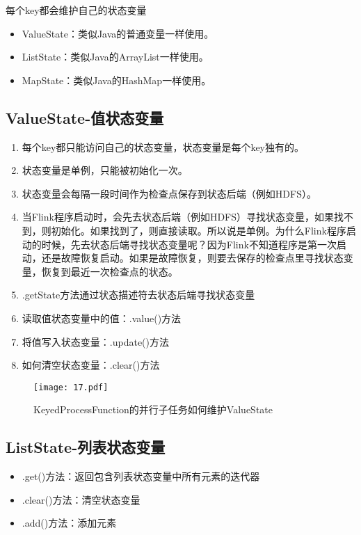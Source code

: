 \documentclass[cn,11pt,chinese]{elegantbook}
\begin{document}
每个key都会维护自己的状态变量

\begin{itemize}
  \item ValueState：类似Java的普通变量一样使用。
  \item ListState：类似Java的ArrayList一样使用。
  \item MapState：类似Java的HashMap一样使用。
\end{itemize}

\subsection{ValueState-值状态变量}

\begin{enumerate}
  \item 每个key都只能访问自己的状态变量，状态变量是每个key独有的。
  \item 状态变量是单例，只能被初始化一次。
  \item 状态变量会每隔一段时间作为检查点保存到状态后端（例如HDFS）。
  \item 当Flink程序启动时，会先去状态后端（例如HDFS）寻找状态变量，如果找不到，则初始化。如果找到了，则直接读取。所以说是单例。为什么Flink程序启动的时候，先去状态后端寻找状态变量呢？因为Flink不知道程序是第一次启动，还是故障恢复启动。如果是故障恢复，则要去保存的检查点里寻找状态变量，恢复到最近一次检查点的状态。
  \item .getState方法通过状态描述符去状态后端寻找状态变量
  \item 读取值状态变量中的值：.value()方法
  \item 将值写入状态变量：.update()方法
  \item 如何清空状态变量：.clear()方法
\end{enumerate}

\clearpage
\begin{figure}[htbp]
  \centering
  \texttt{[image: 17.pdf]}
  \caption{KeyedProcessFunction的并行子任务如何维护ValueState}
\end{figure}

\subsection{ListState-列表状态变量}

\begin{itemize}
  \item .get()方法：返回包含列表状态变量中所有元素的迭代器
  \item .clear()方法：清空状态变量
  \item .add()方法：添加元素
\end{itemize}
\end{document}
